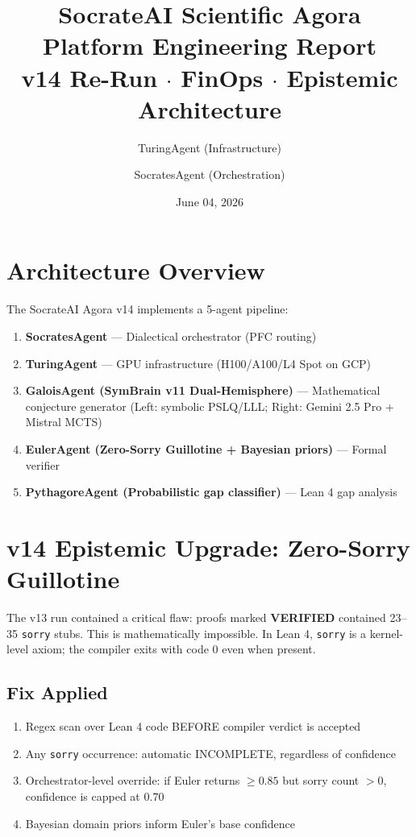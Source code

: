 \documentclass[12pt,a4paper]{article}
\title{
  \textbf{SocrateAI Scientific Agora}\\
  \large Platform Engineering Report\\
  \normalsize v14 Re-Run $\cdot$ FinOps $\cdot$ Epistemic Architecture
}
\author{TuringAgent (Infrastructure) \and SocratesAgent (Orchestration)}
\date{June 04, 2026}
\begin{document}
\maketitle
\tableofcontents
\newpage

\section{Architecture Overview}

The SocrateAI Agora v14 implements a 5-agent pipeline:

\begin{enumerate}
  \item \textbf{SocratesAgent} — Dialectical orchestrator (PFC routing)
  \item \textbf{TuringAgent} — GPU infrastructure (H100/A100/L4 Spot on GCP)
  \item \textbf{GaloisAgent (SymBrain v11 Dual-Hemisphere)} — Mathematical
    conjecture generator (Left: symbolic PSLQ/LLL; Right: Gemini 2.5 Pro + Mistral MCTS)
  \item \textbf{EulerAgent (Zero-Sorry Guillotine + Bayesian priors)} — Formal verifier
  \item \textbf{PythagoreAgent (Probabilistic gap classifier)} — Lean 4 gap analysis
\end{enumerate}

\section{v14 Epistemic Upgrade: Zero-Sorry Guillotine}

The v13 run contained a critical flaw: proofs marked \textbf{VERIFIED} contained
23--35 \texttt{sorry} stubs. This is mathematically impossible. In Lean 4,
\texttt{sorry} is a kernel-level axiom; the compiler exits with code 0 even
when present.

\subsection*{Fix Applied}

\begin{enumerate}
  \item Regex scan over Lean 4 code BEFORE compiler verdict is accepted
  \item Any \texttt{sorry} occurrence: automatic INCOMPLETE, regardless of confidence
  \item Orchestrator-level override: if Euler returns $\geq 0.85$ but sorry count $> 0$,
    confidence is capped at $0.70$
  \item Bayesian domain priors inform Euler's base confidence
\end{enumerate}
\end{document}
